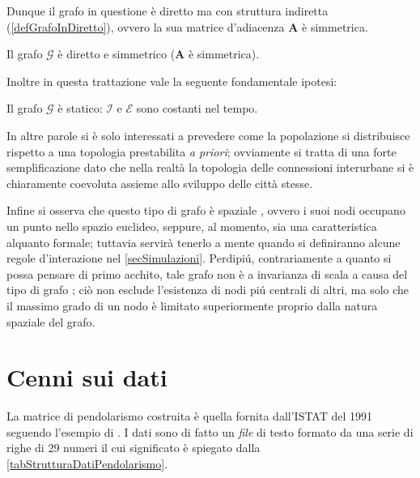         Dunque il grafo in questione è diretto ma con struttura indiretta (\cref{defGrafoInDiretto}), ovvero la sua matrice d'adiacenza \(\mathbf A\) è simmetrica.

        \begin{ipo}
            \label{ipTipoGrafo}
            Il grafo \(\mathcal G\) è diretto e simmetrico (\(\mathbf A\) è simmetrica).
        \end{ipo}

        Inoltre in questa trattazione vale la seguente fondamentale ipotesi:

        \begin{ipo}
            \label{ipGrafoStatico}
            Il grafo \(\mathcal G\) è statico: \(\mathcal I\) e \(\mathcal E\) sono costanti nel tempo.
        \end{ipo}

        In altre parole si è solo interessati a prevedere come la popolazione si distribuisce rispetto a una topologia prestabilita \textit{a priori}; ovviamente si tratta di una forte semplificazione dato che nella realtà la topologia delle connessioni interurbane si è chiaramente coevoluta assieme allo sviluppo delle città stesse.

        Infine si osserva che questo tipo di grafo è spaziale \cite{Barthelemy2011,DeMontis2007}, ovvero i suoi nodi occupano un punto nello spazio euclideo, seppure, al momento, sia una caratteristica alquanto formale; tuttavia servirà tenerlo a mente quando si definiranno alcune regole d'interazione nel \cref{secSimulazioni}. Perdipiú, contrariamente a quanto si possa pensare di primo acchito, tale grafo non è a invarianza di scala \cite{Barabasi1999} a causa del tipo di grafo \cite{Broido2019,Barthelemy2011}; ciò non esclude l'esistenza di nodi piú centrali di altri, ma solo che il massimo grado di un nodo è limitato superiormente proprio dalla natura spaziale del grafo.

    \section{Cenni sui dati}\label{secCenniSuiDati}

        La matrice di pendolarismo costruita è quella fornita dall'ISTAT del 1991 \cite{ISTATPendolarismo1991} seguendo l'esempio di \cite{DeMontis2007}. I dati sono di fatto un \textit{file} di testo formato da una serie di righe di 29 numeri il cui significato è spiegato dalla \cref{tabStrutturaDatiPendolarismo}.

